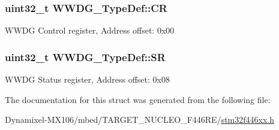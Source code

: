\subsubsection[{\texorpdfstring{CR}{CR}}]{ uint32\+\_\+t W\+W\+D\+G\+\_\+\+Type\+Def\+::\+CR}\hypertarget{struct_w_w_d_g___type_def_a4caf530d45f7428c9700d9c0057135f8}{}\label{struct_w_w_d_g___type_def_a4caf530d45f7428c9700d9c0057135f8}
W\+W\+DG Control register, Address offset\+: 0x00 
\subsubsection[{\texorpdfstring{SR}{SR}}]{ uint32\+\_\+t W\+W\+D\+G\+\_\+\+Type\+Def\+::\+SR}\hypertarget{struct_w_w_d_g___type_def_a15655cda4854cc794db1f27b3c0bba38}{}\label{struct_w_w_d_g___type_def_a15655cda4854cc794db1f27b3c0bba38}
W\+W\+DG Status register, Address offset\+: 0x08 

The documentation for this struct was generated from the following file\+:\begin{DoxyCompactItemize}
\item 
Dynamixel-\/\+M\+X106/mbed/\+T\+A\+R\+G\+E\+T\+\_\+\+N\+U\+C\+L\+E\+O\+\_\+\+F446\+R\+E/\hyperlink{stm32f446xx_8h}{stm32f446xx.\+h}\end{DoxyCompactItemize}
